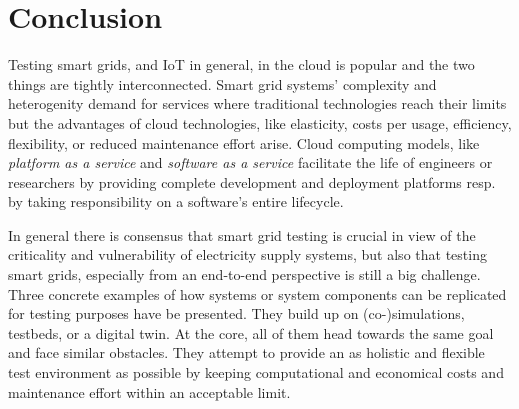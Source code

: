 \section{Conclusion}

Testing smart grids, and IoT in general, in the cloud is popular and the two things are tightly interconnected. Smart grid systems' complexity and heterogenity demand for services where traditional technologies reach their limits but the advantages of cloud technologies, like elasticity, costs per usage, efficiency, flexibility, or reduced maintenance effort arise. Cloud computing models, like \textit{platform as a service} and \textit{software as a service} facilitate the life of engineers or researchers by providing complete development and deployment platforms resp. by taking responsibility on a software's entire lifecycle.

In general there is consensus that smart grid testing is crucial in view of the criticality and vulnerability of electricity supply systems, but also that testing smart grids, especially from an end-to-end perspective is still a big challenge. Three concrete examples of how systems or system components can be replicated for testing purposes have be presented. They build up on (co-)simulations, testbeds, or a digital twin. At the core, all of them head towards the same goal and face similar obstacles. They attempt to provide an as holistic and flexible test environment as possible by keeping computational and economical costs and maintenance effort within an acceptable limit.
